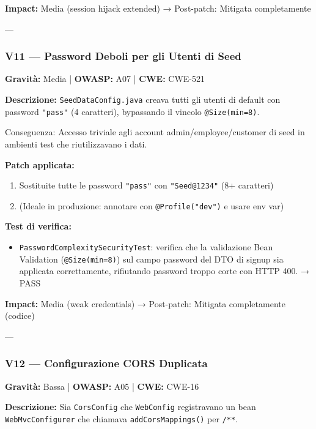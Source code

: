 \documentclass[12pt, a4paper]{article}
\begin{document}
    \textbf{Impact:} Media (session hijack extended) → Post-patch: Mitigata completamente

    ---

    \subsubsection{V11 — Password Deboli per gli Utenti di Seed}

    \textbf{Gravità:} Media | \textbf{OWASP:} A07 | \textbf{CWE:} CWE-521

    \textbf{Descrizione:} \texttt{SeedDataConfig.java} creava tutti gli utenti di default
    con password \texttt{"pass"} (4 caratteri), bypassando il vincolo \texttt{@Size(min=8)}.

    Conseguenza: Accesso triviale agli account admin/employee/customer di seed in ambienti
    test che riutilizzavano i dati.

    \textbf{Patch applicata:}
    \begin{enumerate}
        \item Sostituite tutte le password \texttt{"pass"} con \texttt{"Seed@1234"} (8+ caratteri)
        \item (Ideale in produzione: annotare con \texttt{@Profile("dev")} e usare env var)
    \end{enumerate}

    \textbf{Test di verifica:}
    \begin{itemize}
        \item \texttt{PasswordComplexitySecurityTest}: verifica che la validazione Bean Validation
        (\texttt{@Size(min=8)}) sul campo password del DTO di signup sia applicata correttamente,
        rifiutando password troppo corte con HTTP 400. → \checkmark{} PASS
    \end{itemize}

    \textbf{Impact:} Media (weak credentials) → Post-patch: Mitigata completamente (codice)

    ---

    \subsubsection{V12 — Configurazione CORS Duplicata}

    \textbf{Gravità:} Bassa | \textbf{OWASP:} A05 | \textbf{CWE:} CWE-16

    \textbf{Descrizione:} Sia \texttt{CorsConfig} che \texttt{WebConfig} registravano
    un bean \texttt{WebMvcConfigurer} che chiamava \texttt{addCorsMappings()} per \texttt{/**}.
\end{document}
